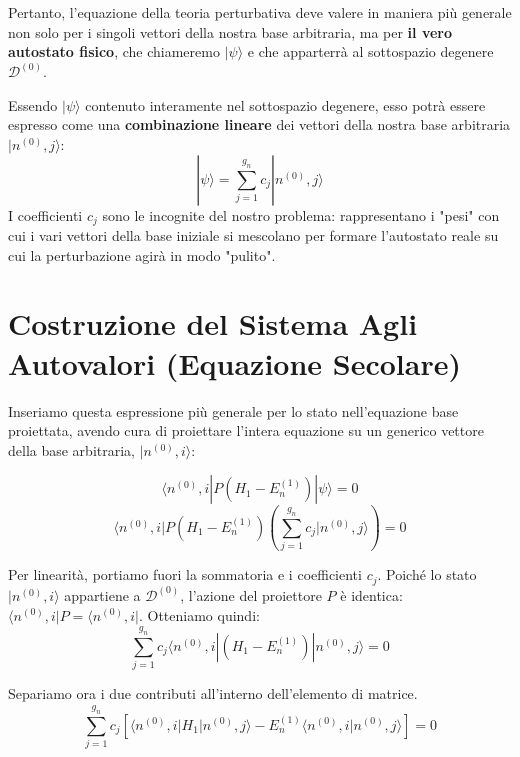 Pertanto, l'equazione della teoria perturbativa deve valere in maniera più generale non solo per i singoli vettori della nostra base arbitraria, ma per \textbf{il vero autostato fisico}, che chiameremo $\vert{}\psi\rangle$ e che apparterrà al sottospazio degenere $\mathcal{D}^{(0)}$.

Essendo $\vert{}\psi\rangle$ contenuto interamente nel sottospazio degenere, esso potrà essere espresso come una \textbf{combinazione lineare} dei vettori della nostra base arbitraria $\vert{}n^{(0)}, j\rangle$:
\begin{equation}
|\psi\rangle = \sum_{j=1}^{g_n} c_j |n^{(0)}, j\rangle
\end{equation}
I coefficienti $c_j$ sono le incognite del nostro problema: rappresentano i "pesi" con cui i vari vettori della base iniziale si mescolano per formare l'autostato reale su cui la perturbazione agirà in modo "pulito".

\section{Costruzione del Sistema Agli Autovalori (Equazione Secolare)}

Inseriamo questa espressione più generale per lo stato nell'equazione base proiettata, avendo cura di proiettare l'intera equazione su un generico vettore della base arbitraria, $\vert{}n^{(0)}, i\rangle$:

\begin{equation}
\langle n^{(0)}, i | P \left( H_1 - E_{n}^{(1)} \right) |\psi\rangle = 0
\end{equation}
\begin{equation}
\langle n^{(0)}, i | P \left( H_1 - E_{n}^{(1)} \right) \left( \sum_{j=1}^{g_n} c_j |n^{(0)}, j\rangle \right) = 0
\end{equation}

Per linearità, portiamo fuori la sommatoria e i coefficienti $c_j$. Poiché lo stato $\vert{}n^{(0)}, i\rangle$ appartiene a $\mathcal{D}^{(0)}$, l'azione del proiettore $P$ è identica: $\langle n^{(0)}, i \vert{} P = \langle n^{(0)}, i \vert{}$.
Otteniamo quindi:
\begin{equation}
\sum_{j=1}^{g_n} c_j \langle n^{(0)}, i | \left( H_1 - E_n^{(1)} \right) |n^{(0)}, j\rangle = 0
\end{equation}

Separiamo ora i due contributi all'interno dell'elemento di matrice.
\begin{equation}
\sum_{j=1}^{g_n} c_j \left[ \langle n^{(0)}, i | H_1 | n^{(0)}, j\rangle - E_n^{(1)} \langle n^{(0)}, i | n^{(0)}, j\rangle \right] = 0
\end{equation}

